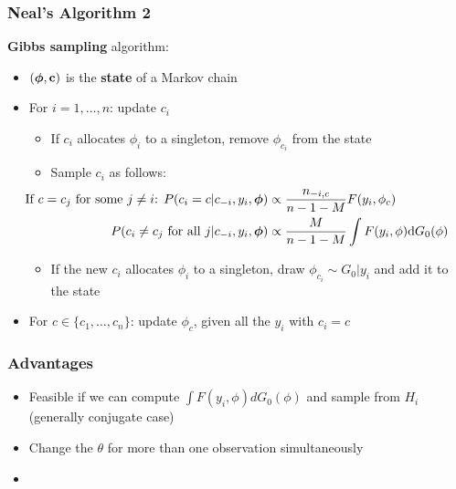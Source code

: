 \begin{frame} %
	\frametitle{Neal's Algorithm 2}
	\textbf{Gibbs sampling} algorithm:
	\begin{itemize}
		\item $(\boldsymbol\phi, \textbf c)$ is the \textbf{state} of a Markov chain
	    \item For $i= 1,\dots,n$: update $c_{i}$
	    \begin{itemize}
	        \item If $c_{i}$ allocates $\phi_i$ to a singleton, remove $\phi_{c_{i}}$ from the state
		    \item Sample $c_i$ as follows:
	        \begin{align*}
		        \hspace{-35pt}
                \text{If $c=c_j$ for some $j\neq i$: } P(c_{i}=c | c_{-i}, y_{i},\boldsymbol\phi) &\propto \frac{n_{-i,c}}{n-1-M} F(y_{i},\phi_{c}) \\
                P(c_{i}\neq c_{j} \text{ for all } j | c_{-i}, y_{i},\boldsymbol\phi) &\propto \frac{M }{n-1-M} \int F(y_{i},\phi) \de G_{0}(\phi)
            \end{align*}
            \pause
            \item If the new $c_{i}$ allocates $\phi_i$ to a singleton, draw $\phi_{c_{i}} \sim G_0|y_i$ and add it to the state %
        \end{itemize} 
        
       	\item For $c \in \{c_{1},\dots,c_{n}\}$: update $\phi_{c}$, given all the $y_{i}$ with $c_{i}=c$
	\end{itemize}
		
\end{frame}


\begin{frame} %
	\frametitle{Advantages}
	\begin{itemize}
	    \item Feasible if we can compute $\int F(y_{i},\phi)dG_{0}(\phi)$ and sample from $H_{i}$ (generally conjugate case)
	    \item Change the $\theta$ for more than one observation simultaneously
	    \item %
	\end{itemize}
\end{frame}


